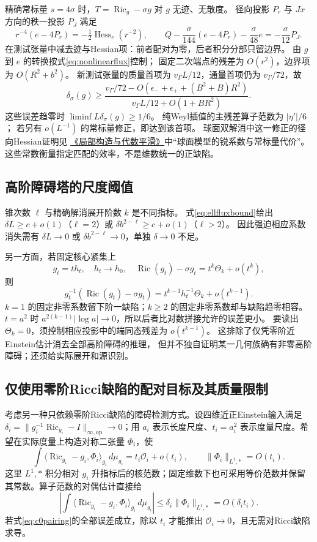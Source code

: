 \documentclass[UTF8,a4paper,11pt,fontset=fandol]{ctexart}
\numberwithin{equation}{section}
\theoremstyle{definition}
\newcommand{\Ric}{\operatorname{Ric}}
\newcommand{\op}{\mathrm{op}}
\begin{document}
精确常标量 $s=4\sigma$ 时，$T=\Ric_g-\sigma g$ 对 $g$ 无迹、无散度。
径向投影 $P_r$ 与 $Jx$ 方向的秩一投影 $P_J$ 满足
\[
r^{-4}(e-4P_r)=-\tfrac12\operatorname{Hess}_e(r^{-2}),\qquad
Q-\frac{\sigma}{144}(e-4P_r)-\frac{\sigma}{48}e=-\frac{\sigma}{12}P_J.
\]
在测试张量中减去迹与Hessian项：前者配对为零，后者积分分部只留边界。
由 $g$ 到 $e$ 的转换按式\eqref{eq:nonlinearflux}控制；
固定二次端点的残差为 $O(r^2)$，边界项为 $O(R^2+b^2)$。
新测试张量的质量首项为 $v_\Gamma L/12$，通量首项仍为 $v_\Gamma/72$，故
\[
\delta_\sigma(g)\ge
\frac{v_\Gamma/72-O(\epsilon_-+\epsilon_++(B^2+B)R^2)}
{v_\Gamma L/12+O(1+BR^2)}.
\]
这些误差趋零时 $\liminf L\delta_\sigma(g)\ge1/6$。
纯Weyl插值的主残差算子范数为 $|\eta'|/6$；
若另有 $o(L^{-1})$ 的常标量修正，即达到该首项。
球面双解消中这一修正的径向Hessian证明见
\href{20260912.tex}{《局部构造与代数平滑》}中“球面模型的锐系数与常标量代价”。
这些常数衡量指定匹配的效率，不是维数统一的正缺陷。

\subsection{高阶障碍塔的尺度阈值}
锥次数 $\ell$ 与精确解消展开阶数 $k$ 是不同指标。
式\eqref{eq:ellfluxbound}给出
$\delta L\ge c+o(1)$（$\ell=2$）或
$\delta b^{2-\ell}\ge c+o(1)$（$\ell>2$）。
因此强迫相应系数消失需有 $\delta L\to0$ 或
$\delta b^{2-\ell}\to0$，单独 $\delta\to0$ 不足。

另一方面，若固定核心紧集上
\[
g_t=t h_t,\quad h_t\to h_0,\quad
\Ric(g_t)-\sigma g_t=t^k\Theta_k+o(t^k),
\]
则
\[
g_t^{-1}(\Ric(g_t)-\sigma g_t)
=t^{k-1}h_t^{-1}\Theta_k+o(t^{k-1}).
\]
$k=1$ 的固定非零系数留下阶一缺陷；$k\ge2$ 的固定非零系数却与缺陷趋零相容。
$t=a^2$ 时 $a^{2(k-1)}|\log a|\to0$，所以后者比对数拼接允许的误差更小。
要读出 $\Theta_k=0$，须控制相应投影中的端同态残差为 $o(t^{k-1})$。
这排除了仅凭零阶近Einstein估计消去全部高阶障碍的推理，
但并不独自证明某一几何族确有非零高阶障碍；还须给实际展开和源识别。

\subsection{仅使用零阶Ricci缺陷的配对目标及其质量限制}\label{sec:c0pairing}
考虑另一种只依赖零阶Ricci缺陷的障碍检测方式。设四维近正Einstein输入满足 $\delta_i=\|g_i^{-1}\Ric_{g_i}-I\|_{\infty,\op}\to0$；用 $a_i$ 表示长度尺度、$t_i=a_i^2$ 表示度量尺度。希望在实际度量上构造对称二张量 $\Phi_i$，使
\begin{equation}\label{eq:c0pairing}
\int\langle\Ric_{g_i}-g_i,\Phi_i\rangle_{g_i}\,d\mu_{g_i}
=t_i\mathcal O_i+o(t_i),\qquad
\|\Phi_i\|_{L^1,*}=O(t_i).
\end{equation}
这里 $L^1,*$ 积分相对 $g_i$ 升指标后的核范数；固定维数下也可采用等价范数并保留其常数。算子范数的对偶估计直接给
\[
\left|\int\langle\Ric_{g_i}-g_i,\Phi_i\rangle_{g_i}\,d\mu_{g_i}\right|
\le\delta_i\|\Phi_i\|_{L^1,*}=O(\delta_it_i).
\]
若式\eqref{eq:c0pairing}的全部误差成立，除以 $t_i$ 才能推出 $\mathcal O_i\to0$，且无需对Ricci缺陷求导。
\end{document}
